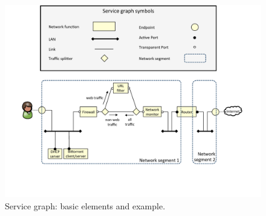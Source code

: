 \begin{figure}%
	\centering
	\includegraphics[clip= true, width= 0.8\columnwidth, trim= 1.5cm 3.0cm 0.6cm 0.0cm]{images/service_graph_components.pdf}
	\caption{Service graph: basic elements and example.}
	\label{fig:service_graph}
\end{figure}

